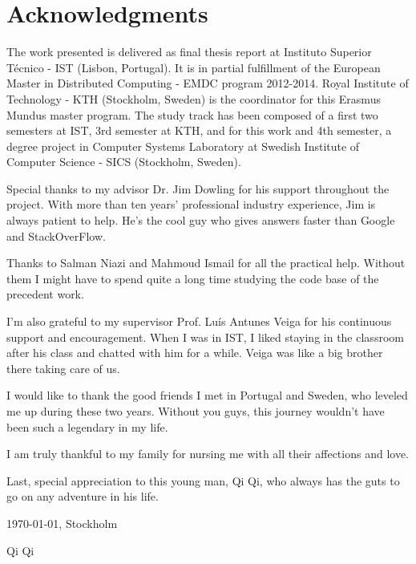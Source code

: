 \chapter*{Acknowledgments}
\thispagestyle{empty}


The work presented is delivered as final thesis report at Instituto Superior Técnico - IST (Lisbon, Portugal). It is in partial fulfillment of the European Master in Distributed Computing - EMDC program 2012-2014. Royal Institute of Technology - KTH (Stockholm, Sweden) is the coordinator for this Erasmus Mundus master program. The study track has been composed of a first two semesters at IST, 3rd semester at KTH, and for this work and 4th semester, a degree project in Computer Systems Laboratory at Swedish Institute of Computer Science - SICS (Stockholm, Sweden).

\noindent Special thanks to my advisor Dr. Jim Dowling for his support throughout the project. With more than ten years' professional industry experience, Jim is always patient to help. He's the cool guy who gives answers faster than Google and StackOverFlow.

\noindent Thanks to Salman Niazi and Mahmoud Ismail for all the practical help. Without them I might have to spend quite a long time studying the code base of the precedent work. 

\noindent I'm also grateful to my supervisor Prof. Luís Antunes Veiga for his continuous support and encouragement. When I was in IST, I liked staying in the classroom after his class and chatted with him for a while. Veiga was like a big brother there taking care of us.

\noindent I would like to thank the good friends I met in Portugal and Sweden, who leveled me up during these two years. Without you guys, this journey wouldn't have been such a legendary in my life.

\noindent I am truly thankful to my family for nursing me with all their affections and love.

\noindent Last, special appreciation to this young man, Qi Qi, who always has the guts to go on any adventure in his life.

\vfill
\begin{flushright}
  \begin{minipage}{8cm}
    \begin{center}
      \today, Stockholm

      Qi Qi
    \end{center}
  \end{minipage}
\end{flushright}

